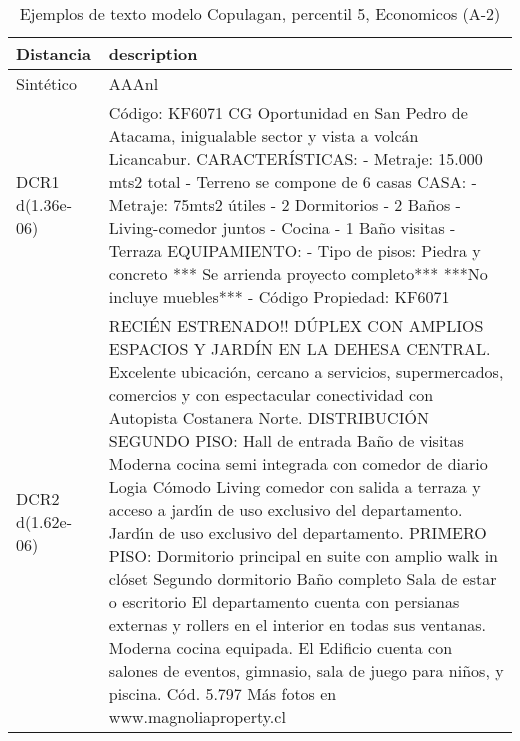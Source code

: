 \begin{table}[H]
\centering
\fontsize{10}{14}\selectfont
\caption{Ejemplos de texto modelo Copulagan, percentil 5, Economicos (A-2)}
\label{table-example-economicos-a-2-copulagan-5p-text}
\begin{tabular}{|l|m{35em}|}
\hline
\rowcolor[gray]{0.8}
Distancia & description \\
\hline Sintético & AAAnl \\
\hline DCR1 d(1.36e-06) & C\'odigo: KF6071 CG  Oportunidad en San Pedro de Atacama, inigualable sector y vista a volc\'an Licancabur.  CARACTER\'ISTICAS: - Metraje: 15.000 mts2 total - Terreno se compone de 6 casas  CASA: -Metraje:  75mts2 \'utiles - 2 Dormitorios - 2 Ba\~nos - Living-comedor juntos - Cocina - 1 Ba\~no visitas - Terraza  EQUIPAMIENTO: - Tipo de pisos: Piedra y concreto   *** Se arrienda proyecto completo*** ***No incluye muebles*** - C\'odigo Propiedad: KF6071 \\
\hline DCR2 d(1.62e-06) & RECI\'EN ESTRENADO!! D\'UPLEX CON AMPLIOS ESPACIOS Y JARD\'IN EN LA DEHESA CENTRAL.  Excelente ubicaci\'on, cercano a servicios, supermercados, comercios y con espectacular conectividad con Autopista Costanera Norte.  DISTRIBUCI\'ON  SEGUNDO PISO:  Hall de entrada Ba\~no de visitas Moderna cocina semi integrada con comedor de diario  Logia C\'omodo Living comedor con salida a terraza y acceso a jard{\'\i}n de uso exclusivo del departamento. Jard{\'\i}n de uso exclusivo del departamento.   PRIMERO PISO: Dormitorio principal en suite con amplio walk in cl\'oset Segundo dormitorio  Ba\~no completo Sala de estar o escritorio  El departamento cuenta con persianas externas y rollers en el interior en todas sus ventanas. Moderna cocina equipada.  El Edificio cuenta con salones de eventos, gimnasio, sala de juego para ni\~nos, y piscina.  C\'od. 5.797  M\'as fotos en www.magnoliaproperty.cl \\
\hline
\end{tabular}
\end{table}
